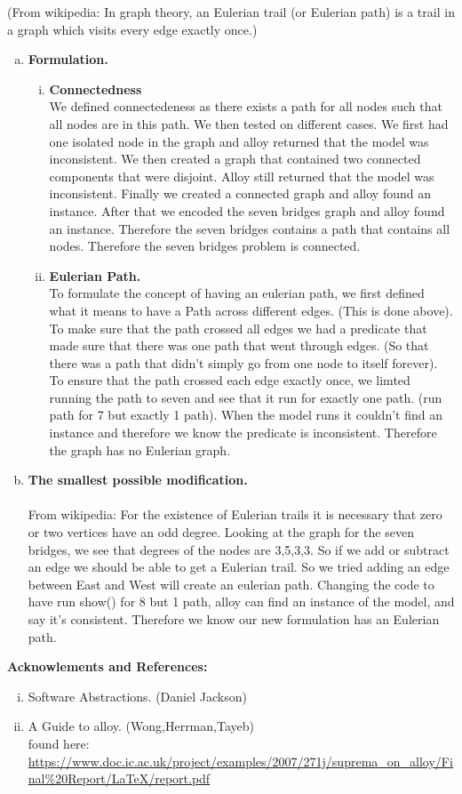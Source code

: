 \documentclass[11pt,leqno,fleqn]{article}
\begin{document}
(From wikipedia: In graph theory, an Eulerian trail (or Eulerian path) is a trail in a graph which visits every edge exactly once.)\\
\begin{enumerate}[(a)]
\item \textbf{Formulation.}\\
\begin{enumerate}[(i)]
\item \textbf{Connectedness}\\
We defined connectedeness as there exists a path  for all nodes such that all nodes are in this path. We then tested on different cases. We first had one isolated node in the graph and alloy returned that the model was inconsistent. We then created a graph that contained two connected components that were disjoint. Alloy still returned that the model was inconsistent. Finally we created a connected graph and alloy found an instance. After that we encoded the seven bridges graph and alloy found an instance. Therefore the seven bridges contains a path that contains all nodes. Therefore the seven bridges problem is connected.
\item \textbf{Eulerian Path.}\\
To formulate the concept of having an eulerian path, we first defined what it means to have a Path across different edges.  (This is done above). To make sure that the path crossed all edges we had a predicate that made sure that there was one path that went through edges. (So that there was a path that didn't simply go from one node to itself forever). \\
To ensure that the path crossed each edge exactly once, we limted running the path to seven and see that it run for exactly one path. (run path for 7 but exactly 1 path). When the model runs it couldn't find an instance and therefore we know the predicate is inconsistent. Therefore the graph has no Eulerian graph.\\
\end{enumerate}
\item \textbf{The smallest possible modification.}\\
\\
From wikipedia: For the existence of Eulerian trails it is necessary that zero or two vertices have an odd degree. Looking at the graph for the seven bridges, we see that degrees of the nodes are 3,5,3,3. So if we add or subtract an edge we should be able to get a Eulerian trail. So we tried adding an edge between East and West will create an eulerian path. Changing the code to have run show() for 8 but 1 path, alloy can find an instance of the model, and say it's consistent. Therefore we know our new formulation has an Eulerian path.

\end{enumerate}

\textbf{Acknowlements and References:}
\begin{enumerate}[(i)]
\item Software Abstractions. (Daniel Jackson)
\item A Guide to alloy. (Wong,Herrman,Tayeb)\\
found here:\\
\url{https://www.doc.ic.ac.uk/project/examples/2007/271j/suprema_on_alloy/Final\%20Report/LaTeX/report.pdf}

\end{enumerate}
\end{document}
